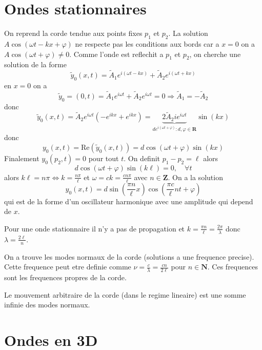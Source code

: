 \section{Ondes stationnaires}

On reprend la corde tendue aux points fixes $p_{1}$ et $p_{2}$. La solution $A\cos(\omega t-kx+\varphi)$ ne respecte pas les conditions aux bords car a $x=0$ on a $A\cos(\omega t+\varphi)\neq 0$. Comme l'onde est reflechit a $p_{1}$ et $p_{2}$, on cherche une solution de la forme 
$$
\tilde{y}_{0}(x,t)=\tilde{A}_{1}e^{i(\omega t-kx)}+\tilde{A}_{2}e^{i(\omega t+kx)}
$$
en $x=0$ on a
$$
\tilde{y}_{0}=(0,t)=\tilde{A}_{1}e^{i\omega t}+\tilde{A}_{2}e^{i\omega t}=0\Rightarrow \tilde{A}_{1}=-\tilde{A}_{2}
$$
donc 
$$
\tilde{y}_{0}(x,t)=\tilde{A}_{2}e^{i\omega t}(-e^{ikx}+e^{ikx})=\underbrace{ 2\tilde{A}_{2}ie^{i\omega t} }_{ de^{i(\omega t+\varphi)}:d,\varphi \in \mathbf{R} }\sin(kx)
$$
donc
$$
y_{0}(x,t)=\mathrm{Re}(\tilde{y}_{0}(x,t))=d\cos (\omega t+\varphi)\sin(kx)
$$
Finalement $y_{0}(p_{2},t)=0$ pour tout $t$. On definit $p_{1}-p_{2}=\ell$ alors
$$
d\cos(\omega t+\varphi)\sin(k\ell)=0,\quad \forall t 
$$
alors $k\ell=n\pi \Leftrightarrow k=\frac{n\pi}{\ell}$ et $\omega=ck=\frac{cn\pi}{\ell}$ avec $n\in \mathbf{Z}$. On a la solution
$$
y_{0}(x,t)=d\sin\left( \frac{\pi n}{\ell}x \right)\cos\left( \frac{\pi c}{\ell}nt+\varphi \right)
$$
qui est de la forme d'un oscillateur harmonique avec une amplitude qui depend de $x$.

Pour une onde stationnaire il n'y a pas de propagation et $k=\frac{\pi n}{\ell }=\frac{2\pi}{\lambda}$ donc $\lambda=\frac{2\ell}{n}$.

On a trouve les modes normaux de la corde (solutions a une frequence precise). Cette frequence peut etre definie comme $\nu=\frac{c}{\lambda}=\frac{cn}{2\ell}$ pour $n\in \mathbf{N}$. Ces frequences sont les frequences propres de la corde. 

\begin{proposition}
Le mouvement arbitraire de la corde (dans le regime lineaire) est une somme infinie des modes normaux.
\end{proposition}


\section{Ondes en 3D}

